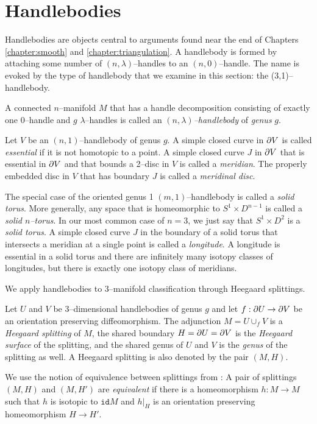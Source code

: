\section{Handlebodies}
\label{section:problem-handlebodies}

Handlebodies are objects central to arguments found near the end of Chapters \ref{chapter:smooth} and \ref{chapter:triangulation}.
A handlebody is formed by attaching some number of $(n,\lambda)$--handles to an $(n,0)$--handle.
The name is evoked by the type of handlebody that we examine in this section: the (3,1)--handlebody.

\begin{defn}
	A connected $n$--manifold $M$ that has a handle decomposition consisting of exactly one 0--handle and $g$ $\lambda$--handles is called an \emph{$(n,\lambda)$--handlebody} of \emph{genus} $g$.
	
	Let $V$ be an $(n,1)$--handlebody of genus $g$.
	A simple closed curve in $\partial V$ is called \emph{essential} if it is not homotopic to a point.
	A simple closed curve $J$ in $\partial V$ that is essential in $\partial V$ and that bounds a 2--disc in $V$ is called a \emph{meridian}.
	The properly embedded disc in $V$ that has boundary $J$ is called a \emph{meridinal disc}.
	
	The special case of the oriented genus 1 $(m,1)$--handlebody is called a \emph{solid torus}.
	More generally, any space that is homeomorphic to $S^1\times D^{n-1}$ is called a \emph{solid $n$--torus}.
	In our most common case of $n=3$, we just say that $S^1\times D^2$ is a \emph{solid torus}.
	A simple closed curve $J$ in the boundary of a solid torus that intersects a meridian at a single point is called a \emph{longitude}.
	A longitude is essential in a solid torus and there are infinitely many isotopy classes of longitudes, but there is exactly one isotopy class of meridians.
\end{defn}

We apply handlebodies to 3--manifold classification through Heegaard splittings.

\begin{defn}	
	Let $U$ and $V$ be 3--dimensional handlebodies of genus $g$ and let $f:\partial U\to \partial V$ be an orientation preserving diffeomorphism.
	The adjunction $M=U\cup_f V$ is a \emph{Heegaard splitting} of $M$, the shared boundary $H = \partial U = \partial V$ is the \emph{Heegaard surface} of the splitting, and the shared genus of $U$ and $V$ is the \emph{genus} of the splitting as well.
	A Heegaard splitting is also denoted by the pair $(M,H)$.
	
	We use the notion of equivalence between splittings from \cite{SchlWald}:
	A pair of splittings $(M,H)$ and $(M,H')$ are \emph{equivalent} if there is a homeomorphism $h:M\to M$ such that $h$ is isotopic to $\texttt{id}M$ and $h|_H$ is an orientation preserving homeomorphism $H\to H'$.
\end{defn}

